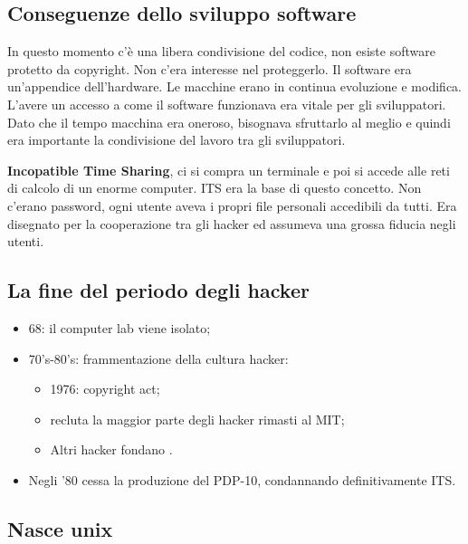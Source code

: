 \subsection{Conseguenze dello sviluppo software}

In questo momento c'è una libera condivisione del codice, non esiste software protetto da copyright. Non c'era interesse nel proteggerlo. Il software era un'appendice dell'hardware. Le macchine erano in continua evoluzione e modifica. L'avere un accesso a come il software funzionava era vitale per gli sviluppatori. Dato che il tempo macchina era oneroso, bisognava sfruttarlo al meglio e quindi era importante la condivisione del lavoro tra gli sviluppatori.

\textbf{Incopatible Time Sharing}, ci si compra un terminale e poi si accede alle reti di calcolo di un enorme computer. ITS era la base di questo concetto. Non c'erano password, ogni utente aveva i propri file personali accedibili da tutti. Era disegnato per la cooperazione tra gli hacker ed assumeva una grossa fiducia negli utenti.

\subsection{La fine del periodo degli hacker}

\begin{itemize}

\item 68: il computer lab viene isolato;
\item 70's-80's: frammentazione della cultura hacker:

	\begin{itemize}

	\item 1976: copyright act;
	\item {} recluta la maggior parte degli hacker rimasti al MIT;
	\item Altri hacker fondano .

	\end{itemize}

\item Negli '80 cessa la produzione del PDP-10, condannando definitivamente ITS.

\end{itemize}

\subsection{Nasce unix}

